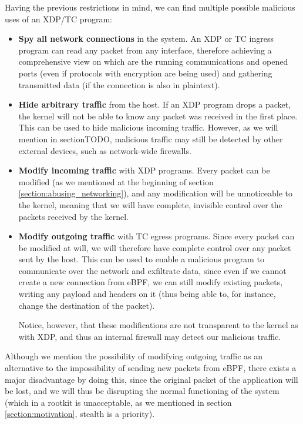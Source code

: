 \documentclass[12pt]{report} %
\begin{document}
Having the previous restrictions in mind, we can find multiple possible malicious uses of an XDP/TC program:
\begin{itemize}
\item \textbf{Spy all network connections} in the system. An XDP or TC ingress program can read any packet from any interface, therefore achieving a comprehensive view on which are the running communications and opened ports (even if protocols with encryption are being used) and gathering transmitted data (if the connection is also in plaintext).
\item \textbf{Hide arbitrary traffic} from the host. If an XDP program drops a packet, the kernel will not be able to know any packet was received in the first place. This can be used to hide malicious incoming traffic. However, as we will mention in section{TODO}, malicious traffic may still be detected by other external devices, such as network-wide firewalls.
\item \textbf{Modify incoming traffic} with XDP programs. Every packet can be modified (as we mentioned at the beginning of section \ref{section:abusing_networking}), and any modification will be unnoticeable to the kernel, meaning that we will have complete, invisible control over the packets received by the kernel.
\item \textbf{Modify outgoing traffic} with TC egress programs. Since every packet can be modified at will, we will therefore have complete control over any packet sent by the host. This can be used to enable a malicious program to communicate over the network and exfiltrate data, since even if we cannot create a new connection from eBPF, we can still modify existing packets, writing any payload and headers on it (thus being able to, for instance, change the destination of the packet).

Notice, however, that these modifications are not transparent to the kernel as with XDP, and thus an internal firewall may detect our malicious traffic.
\end{itemize}

Although we mention the possibility of modifying outgoing traffic as an alternative to the impossibility of sending new packets from eBPF, there exists a major disadvantage by doing this, since the original packet of the application will be lost, and we will thus be disrupting the normal functioning of the system (which in a rootkit is unacceptable, as we mentioned in section \ref{section:motivation}, stealth is a priority).
\end{document}
